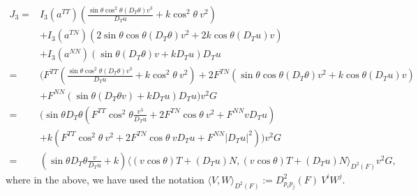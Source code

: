 \documentclass[12pt]{article}
\numberwithin{equation}{section}
\theoremstyle{plain}
\theoremstyle{definition}
\theoremstyle{remark}
\begin{document}
\begin{equation}  \label{eq:ang_J3}
    \begin{split}
        J_3 = & I_3(a^{TT}) \left(\frac{ \sin{\theta} \cos^2\theta (D_T \theta) v^3 }{D_T u} + k \cos^2\theta \ v^2 \right) \\ 
        & + I_3(a^{TN}) \left(2\sin{\theta} \cos{\theta} (D_T \theta) v^2 + 2k \cos{\theta} (D_T u) v \right) \\
        & + I_3(a^{NN}) \left(\sin{\theta} (D_T \theta) v + k D_T u \right) D_T u  \\
        = & \Bigg(  F^{TT} \left(\frac{ \sin{\theta} \cos^2\theta (D_T \theta) v^3 }{D_T u} + k \cos^2\theta \ v^2 \right) + 2 F^{TN} \left(\sin{\theta} \cos{\theta} (D_T \theta) v^2 + k \cos{\theta} (D_T u) v\right)  \\
        & + F^{NN} \left(\sin{\theta} (D_T \theta v) + k D_T u \right) D_T u   \Bigg) v^2 G \\
        = & \Bigg( \sin{\theta} D_T \theta  \left( F^{TT} \cos^2 \theta \frac{v^3}{D_T u} + 2 F^{TN} \cos{\theta} \ v^2 + F^{NN} v D_T u \right) \\
        & + k \left( F^{TT} \cos^2 \theta \ v^2 + 2 F^{TN} \cos{\theta} \ v D_T u + F^{NN} |D_T u|^2 \right)   \Bigg) v^2 G \\
        = & \left( \sin{\theta} D_T \theta \frac{v}{D_T u} + k \right) \Big\langle (v \cos{\theta}) T + (D_T u) N , (v \cos{\theta}) T + (D_T u)  N \Big\rangle_{D^2 (F)} v^2 G,
    \end{split}
\end{equation}
where in the above, we have used the notation $\langle V,W \rangle _{D^2 (F)}:=D^2_{p_i p_j} (F) \ V^i W^j$.
\end{document}
